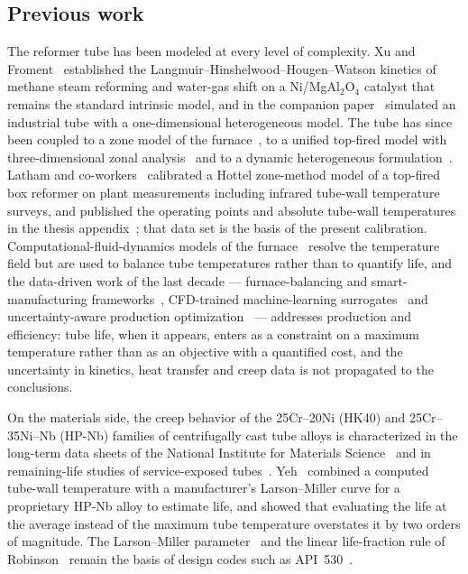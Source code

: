 \documentclass[final,3p,times]{elsarticle}
\begin{document}
\subsection{Previous work}

The reformer tube has been modeled at every level of complexity. Xu and Froment~\cite{xu1989a} established the Langmuir--Hinshelwood--Hougen--Watson kinetics of methane steam reforming and water-gas shift on a Ni/MgAl$_2$O$_4$ catalyst that remains the standard intrinsic model, and in the companion paper~\cite{xu1989b} simulated an industrial tube with a one-dimensional heterogeneous model. The tube has since been coupled to a zone model of the furnace~\cite{plehiers1989}, to a unified top-fired model with three-dimensional zonal analysis~\cite{zamaniyan2008} and to a dynamic heterogeneous formulation~\cite{pantoleontos2012}. Latham and co-workers~\cite{latham2008,latham2011} calibrated a Hottel zone-method model of a top-fired box reformer on plant measurements including infrared tube-wall temperature surveys, and published the operating points and absolute tube-wall temperatures in the thesis appendix~\cite{latham2008}; that data set is the basis of the present calibration. Computational-fluid-dynamics models of the furnace~\cite{lao2016,tran2017,kumar2017} resolve the temperature field but are used to balance tube temperatures rather than to quantify life, and the data-driven work of the last decade --- furnace-balancing and smart-manufacturing frameworks~\cite{kumar2015,kumar2017,tran2017}, CFD-trained machine-learning surrogates~\cite{jafarizadeh2024,nabavi2025} and uncertainty-aware production optimization~\cite{yerimah2025} --- addresses production and efficiency: tube life, when it appears, enters as a constraint on a maximum temperature rather than as an objective with a quantified cost, and the uncertainty in kinetics, heat transfer and creep data is not propagated to the conclusions.

On the materials side, the creep behavior of the 25Cr--20Ni (HK40) and 25Cr--35Ni--Nb (HP-Nb) families of centrifugally cast tube alloys is characterized in the long-term data sheets of the National Institute for Materials Science~\cite{nims16b,nims38a,whittaker2013} and in remaining-life studies of service-exposed tubes~\cite{ray2003,haidemenopoulos2021,guguloth2023}. Yeh~\cite{yeh2021} combined a computed tube-wall temperature with a manufacturer's Larson--Miller curve for a proprietary HP-Nb alloy to estimate life, and showed that evaluating the life at the average instead of the maximum tube temperature overstates it by two orders of magnitude. The Larson--Miller parameter~\cite{larson1952} and the linear life-fraction rule of Robinson~\cite{robinson1952} remain the basis of design codes such as API~530~\cite{api530}.
\end{document}

